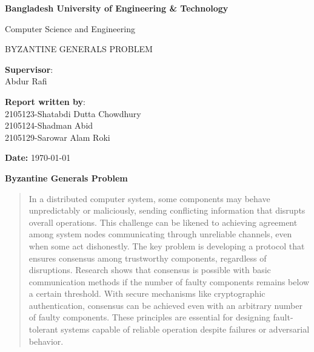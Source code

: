 \documentclass[12pt]{article}
\theoremstyle{remark}
\begin{document}
\begin{titlepage}
    \begin{center}
        \large    
        \textbf{Bangladesh University of Engineering \& Technology}
            
        \vspace{0.5cm}
        \LARGE
            Computer Science and Engineering
        
        \vspace{1.5cm}
            
        \LARGE
            BYZANTINE GENERALS PROBLEM
        \vspace{1.5cm}  
     \end{center}  
     
\raggedright

\Large
    \textbf{Supervisor}:
    \vspace{0.2cm}\\
\Large
    Abdur Rafi
    \vspace{0.125cm}\\

\raggedleft

\Large
    \textbf{Report written by}:
    \vspace{0.125cm}\\
  \Large
    2105123-Shatabdi Dutta Chowdhury
    \vspace{0.125cm}\\
    2105124-Shadman Abid
    \vspace{0.125cm}\\
    2105129-Sarowar Alam Roki

    \vspace{5cm}
        \begin{center}
            \large
            \textbf{Date:} \today
        \end{center}
    
\end{titlepage}

\tableofcontents
\newpage

\begin{center}
    \LARGE \textbf{Byzantine Generals Problem}
\end{center}

\vspace{1 cm}

\begin{abstract}
In a distributed computer system, some components may behave unpredictably or maliciously, sending conflicting information that disrupts overall operations. This challenge can be likened to achieving agreement among system nodes communicating through unreliable channels, even when some act dishonestly. The key problem is developing a protocol that ensures consensus among trustworthy components, regardless of disruptions. Research shows that consensus is possible with basic communication methods if the number of faulty components remains below a certain threshold. With secure mechanisms like cryptographic authentication, consensus can be achieved even with an arbitrary number of faulty components. These principles are essential for designing fault-tolerant systems capable of reliable operation despite failures or adversarial behavior.
\end{abstract}
\end{document}
